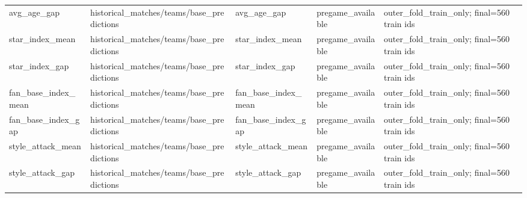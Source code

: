 {\begin{longtable}{p{}p{}p{}p{}p{}}
avg\_\allowbreak{}age\_\allowbreak{}gap & historical\_\allowbreak{}matches/\allowbreak{}teams/\allowbreak{}base\_\allowbreak{}predictions & avg\_\allowbreak{}age\_\allowbreak{}gap & pregame\_\allowbreak{}available & outer\_\allowbreak{}fold\_\allowbreak{}train\_\allowbreak{}only;\allowbreak{} final=560 train ids \\
star\_\allowbreak{}index\_\allowbreak{}mean & historical\_\allowbreak{}matches/\allowbreak{}teams/\allowbreak{}base\_\allowbreak{}predictions & star\_\allowbreak{}index\_\allowbreak{}mean & pregame\_\allowbreak{}available & outer\_\allowbreak{}fold\_\allowbreak{}train\_\allowbreak{}only;\allowbreak{} final=560 train ids \\
star\_\allowbreak{}index\_\allowbreak{}gap & historical\_\allowbreak{}matches/\allowbreak{}teams/\allowbreak{}base\_\allowbreak{}predictions & star\_\allowbreak{}index\_\allowbreak{}gap & pregame\_\allowbreak{}available & outer\_\allowbreak{}fold\_\allowbreak{}train\_\allowbreak{}only;\allowbreak{} final=560 train ids \\
fan\_\allowbreak{}base\_\allowbreak{}index\_\allowbreak{}mean & historical\_\allowbreak{}matches/\allowbreak{}teams/\allowbreak{}base\_\allowbreak{}predictions & fan\_\allowbreak{}base\_\allowbreak{}index\_\allowbreak{}mean & pregame\_\allowbreak{}available & outer\_\allowbreak{}fold\_\allowbreak{}train\_\allowbreak{}only;\allowbreak{} final=560 train ids \\
fan\_\allowbreak{}base\_\allowbreak{}index\_\allowbreak{}gap & historical\_\allowbreak{}matches/\allowbreak{}teams/\allowbreak{}base\_\allowbreak{}predictions & fan\_\allowbreak{}base\_\allowbreak{}index\_\allowbreak{}gap & pregame\_\allowbreak{}available & outer\_\allowbreak{}fold\_\allowbreak{}train\_\allowbreak{}only;\allowbreak{} final=560 train ids \\
style\_\allowbreak{}attack\_\allowbreak{}mean & historical\_\allowbreak{}matches/\allowbreak{}teams/\allowbreak{}base\_\allowbreak{}predictions & style\_\allowbreak{}attack\_\allowbreak{}mean & pregame\_\allowbreak{}available & outer\_\allowbreak{}fold\_\allowbreak{}train\_\allowbreak{}only;\allowbreak{} final=560 train ids \\
style\_\allowbreak{}attack\_\allowbreak{}gap & historical\_\allowbreak{}matches/\allowbreak{}teams/\allowbreak{}base\_\allowbreak{}predictions & style\_\allowbreak{}attack\_\allowbreak{}gap & pregame\_\allowbreak{}available & outer\_\allowbreak{}fold\_\allowbreak{}train\_\allowbreak{}only;\allowbreak{} final=560 train ids \\

\end{longtable}}
